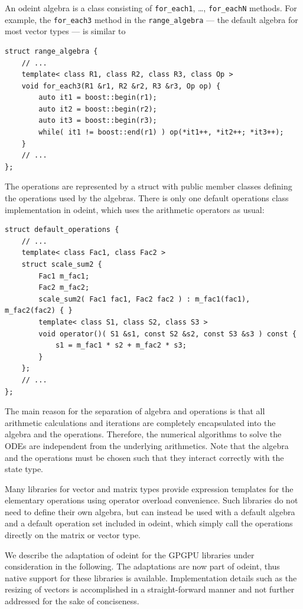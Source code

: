 \documentclass[final]{siamltex}
\newcommand{\code}[1]{\lstinline$#1$}
\begin{document}
An odeint algebra is a class consisting of
\code{for_each1}, \dots, \code{for_eachN} methods. For example, the
\code{for_each3} method in the \code{range_algebra} --- the default algebra for
most vector types --- is similar to
\begin{lstlisting}
struct range_algebra {
    // ...
    template< class R1, class R2, class R3, class Op >
    void for_each3(R1 &r1, R2 &r2, R3 &r3, Op op) {
        auto it1 = boost::begin(r1);
        auto it2 = boost::begin(r2);
        auto it3 = boost::begin(r3);
        while( it1 != boost::end(r1) ) op(*it1++, *it2++; *it3++);
    }
    // ...
};
\end{lstlisting}
The operations are represented by a struct with public member classes defining the
operations used by the algebras. There is only one default
operations class implementation in odeint, which uses the arithmetic operators as usual:
\begin{lstlisting}
struct default_operations {
    // ...
    template< class Fac1, class Fac2 >
    struct scale_sum2 {
        Fac1 m_fac1;
        Fac2 m_fac2;
        scale_sum2( Fac1 fac1, Fac2 fac2 ) : m_fac1(fac1), m_fac2(fac2) { }
        template< class S1, class S2, class S3 >
        void operator()( S1 &s1, const S2 &s2, const S3 &s3 ) const {
            s1 = m_fac1 * s2 + m_fac2 * s3;
        }
    };
    // ...
};
\end{lstlisting}

The main reason for the separation of algebra and operations is that
all arithmetic calculations and iterations are completely encapsulated
into the algebra and the operations. Therefore, the numerical
algorithms to solve the ODEs are independent from the underlying
arithmetics. Note that the algebra and the operations must be chosen
such that they interact correctly with the state type.

Many libraries for vector and matrix types provide expression templates
\cite{Vandevoorde:CppTemplates,Veldhuizen:ExpressionTemplates, Veldhuizen:Techniques}
for the elementary operations using operator overload
convenience.  Such libraries do not need to define their own algebra, but can
instead be used with a default algebra and a default operation set included in
odeint, which simply call the operations directly on the matrix or vector type.

We describe the adaptation of odeint for the GPGPU libraries under
consideration in the following. The adaptations are now part of odeint, thus
native support for these libraries is available.  Implementation details such as
the resizing of vectors is accomplished in a straight-forward manner and not
further addressed for the sake of conciseness.
\end{document}
